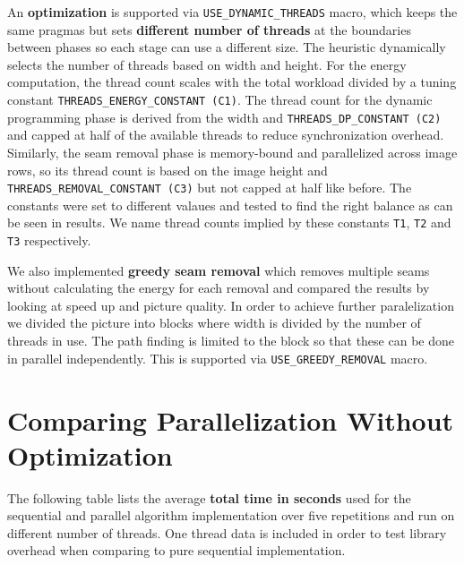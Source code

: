 \documentclass[11pt]{article}
\begin{document}
An \textbf{optimization} is supported via \texttt{USE\_DYNAMIC\_THREADS} macro, which keeps the same pragmas but sets \textbf{different number of threads} at the boundaries between phases so each stage can use a different size. The heuristic dynamically selects the number of threads based on width and height. For the energy computation, the thread count scales with the total workload divided by a tuning constant \texttt{THREADS\_ENERGY\_CONSTANT (C1)}. The thread count for the dynamic programming phase is derived from the width and \texttt{THREADS\_DP\_CONSTANT (C2)} and capped at half of the available threads to reduce synchronization overhead. Similarly, the seam removal phase is memory-bound and parallelized across image rows, so its thread count is based on the image height and \texttt{THREADS\_REMOVAL\_CONSTANT (C3)} but not capped at half like before. The constants were set to different valaues and tested to find the right balance as can be seen in results. We name thread counts implied by these constants \texttt{T1}, \texttt{T2} and \texttt{T3} respectively.

We also implemented \textbf{greedy seam removal} which removes multiple seams without calculating the energy for each removal and compared the results by looking at speed up and picture quality. In order to achieve further paralelization we divided the picture into blocks where width is divided by the number of threads in use. The path finding is limited to the block so that these can be done in parallel independently. This is supported via \texttt{USE\_GREEDY\_REMOVAL} macro.

\section{Comparing Parallelization Without Optimization}

The following table lists the average \textbf{total time in seconds} used for the sequential and parallel algorithm implementation over five repetitions and run on different number of threads. One thread data is included in order to test library overhead when comparing to pure sequential implementation.
\end{document}
